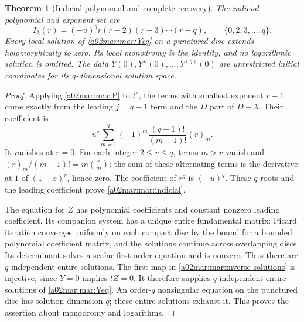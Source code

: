 \documentclass[11pt,a4paper]{article}
\newtheorem{theorem}{Theorem}[section]
\begin{document}
\begin{theorem}[Indicial polynomial and complete recovery]\label{a02mar:mar:scalar-theorem}
The indicial polynomial and exponent set are
\begin{equation}\tag{MAR8}\label{a02mar:mar:indicial}
 I_\lambda(r)=(-u)^q r(r-2)(r-3)\cdots(r-q),
 \qquad\{0,2,3,\ldots,q\}.
\end{equation}
Every local solution of \eqref{a02mar:mar:Yeq} on a punctured disc extends
holomorphically to zero. Its local monodromy is the identity, and no
logarithmic solution is omitted. The data $Y(0),Y''(0),\ldots,Y^{(q)}(0)$
are unrestricted initial coordinates for its $q$-dimensional solution space.
\end{theorem}
\begin{proof}
Applying \eqref{a02mar:mar:P} to $t^r$, the terms with smallest exponent
$r-1$ come exactly from the leading $j=q-1$ term and the $D$ part
of $D-\lambda$. Their coefficient is
\[
 u^q\sum_{m=1}^{q}(-1)^m\frac{(q-1)!}{(m-1)!}(r)_{\underline m}.
\]
It vanishes at $r=0$. For each integer $2\le r\le q$, terms
$m>r$ vanish and
$(r)_{\underline m}/(m-1)!=m\binom rm$; the sum of these
alternating terms is the derivative at $1$ of $(1-x)^r$, hence
zero. The coefficient of $r^q$ is $(-u)^q$. These $q$ roots and
the leading coefficient prove \eqref{a02mar:mar:indicial}.

The equation for $Z$ has polynomial coefficients and constant nonzero
leading coefficient. Its companion system has a unique entire
fundamental matrix: Picard iteration converges uniformly on each compact
disc by the bound for a bounded polynomial coefficient matrix, and the
solutions continue across overlapping discs. Its determinant solves a
scalar first-order equation and is nonzero. Thus there are $q$
independent entire solutions. The first map in
\eqref{a02mar:mar:inverse-solutions} is injective, since $Y=0$ implies
$tZ=0$. It therefore supplies $q$ independent entire solutions of
\eqref{a02mar:mar:Yeq}. An order-$q$ nonsingular equation on the punctured
disc has solution dimension $q$; these entire solutions exhaust it.
This proves the assertion about monodromy and logarithms.


\end{proof}
\end{document}
